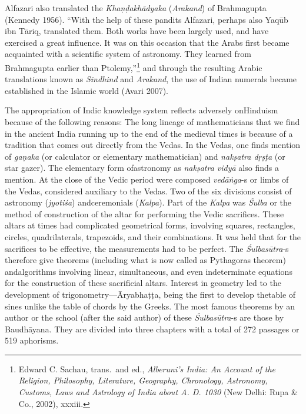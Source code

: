 Alfazari also translated the \textit{Khaṇḍakhādyaka} (\textit{Arakand}) of Brahmagupta (Kennedy 1956). “With the help of these pandits Alfazari, perhaps also Yaqūb ibn Tāriq, translated them. Both works have been largely used, and have exercised a great influence. It was on this occasion that the Arabs first became acquainted with a scientific system of astronomy. They learned from Brahmagupta earlier than Ptolemy,”\footnote{Edward C. Sachau, trans.\ and ed., \textit{Alberuni's 	India: An Account of the Religion, Philosophy, Literature, 	Geography, Chronology, Astronomy, Customs, Laws and Astrology of India about A. D. 1030}  (New Delhi: Rupa \& Co., 2002), xxxiii.} and through the resulting Arabic translations known as \textit{Sindhind} and \textit{Arakand}, the use of Indian numerals became established in the Islamic world (Avari 2007).

The appropriation of Indic knowledge system reflects adversely on\break Hinduism because of the following reasons: The long lineage of mathematicians that we find in the ancient India running up to the end of the medieval times is because of a tradition that comes out directly from the Vedas. In the Vedas, one finds mention of \textit{gaṇaka} (or calculator or elementary mathematician) and \textit{nakṣatra dṛṣṭa} (or star gazer). The elementary form of\break astronomy as \textit{nakṣatra vidyā} also finds a mention. At the close of the Vedic period were composed \textit{vedāṅga}-s or limbs of the Vedas, considered auxiliary to the Vedas. Two of the six divisions consist of astronomy (\textit{jyotiśa}) and\break ceremonials (\textit{Kalpa}). Part of the \textit{Kalpa} was \textit{Śulba} or the method of construction of the altar for performing the Vedic sacrifices. These altars at times had complicated geometrical forms, involving squares, rectangles, circles, quadrilaterals, trapezoids, and their combinations. It was held that for the sacrifices to be effective, the measurements had to be perfect. The \textit{Śulbasūtra}-s therefore give theorems (including what is now called as Pythagoras theorem) and\break algorithms involving linear, simultaneous, and even indeterminate equations for the construction of these sacrificial altars. Interest in geometry led to the development of trigonometry—Āryabhaṭṭa, being the first to develop the\break table of sines unlike the table of chords by the Greeks. The most famous theorems by an author or the school (after the said author) of these \textit{Śulbasūtra}-s are those by Baudhāyana. They are divided into three chapters with a total of 272 passages or 519 aphorisms.
\eject

